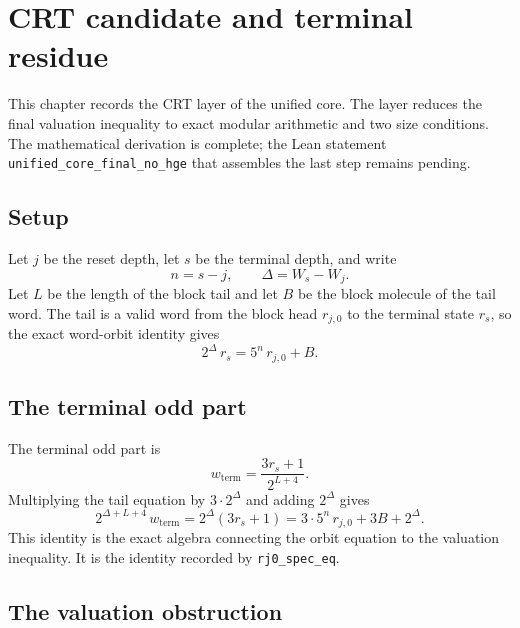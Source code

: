 \section{CRT candidate and terminal residue}

This chapter records the CRT layer of the unified core.  The layer
reduces the final valuation inequality to exact modular arithmetic and
two size conditions.  The mathematical derivation is complete; the
Lean statement \texttt{unified\_core\_final\_no\_hge} that assembles
the last step remains pending.

\subsection{Setup}

Let $j$ be the reset depth, let $s$ be the terminal depth, and write
\begin{equation*}
  n=s-j,\qquad \Delta=W_s-W_j.
\end{equation*}
Let $L$ be the length of the block tail and let $B$ be the block
molecule of the tail word.  The tail is a valid word from the block
head $r_{j,0}$ to the terminal state $r_s$, so the exact word-orbit
identity gives
\begin{equation*}
  2^{\Delta}\,r_s=5^n\,r_{j,0}+B.
\end{equation*}

\subsection{The terminal odd part}

The terminal odd part is
\begin{equation*}
  w_{\mathrm{term}}=\frac{3r_s+1}{2^{L+4}}.
\end{equation*}
Multiplying the tail equation by $3\cdot2^{\Delta}$ and adding
$2^{\Delta}$ gives
\begin{equation*}
  2^{\Delta+L+4}\,w_{\mathrm{term}}
    =2^{\Delta}(3r_s+1)
    =3\cdot5^n\,r_{j,0}+3B+2^{\Delta}.
\end{equation*}
This identity is the exact algebra connecting the orbit equation to
the valuation inequality.  It is the identity recorded by
\texttt{rj0\_\allowbreak spec\_\allowbreak eq}.

\subsection{The valuation obstruction}

